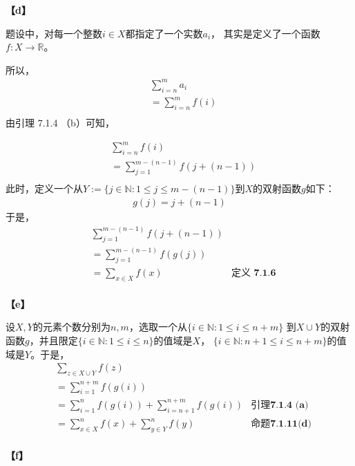 \documentclass{article}
\theoremstyle{mystyle}
\begin{document}
\textbf{【d】}

题设中，对每一个整数$i \in X$都指定了一个实数$a_i$，
其实是定义了一个函数$f:X \rightarrow \mathbb{R}$。

所以，
\begin{align*}
        & \sum\limits_{i=n}^m a_i   \\
        & =\sum\limits_{i=n}^m f(i) \\
\end{align*}
由引理 7.1.4 （b）可知，

\begin{align*}
        & \sum\limits_{i=n}^m f(i)                 \\
        & = \sum\limits_{j=1}^{m-(n-1)} f(j+(n-1)) \\
\end{align*}
此时，定义一个从$Y := \{j \in \mathbb{N}: 1 \leq j \leq m-(n-1)\}$到$X$的双射函数$g$如下：
\begin{align*}
       g(j) = j+(n-1)
\end{align*}
于是，
\begin{align*}
        & \sum\limits_{j=1}^{m-(n-1)} f(j+(n-1))                     \\
        & =\sum\limits_{j=1}^{m-(n-1)} f(g(j))                       \\
        & =\sum\limits_{x \in X} f(x)            & \textbf{定义 7.1.6} \\
\end{align*}

\textbf{【e】}

设$X,Y$的元素个数分别为$n,m$，选取一个从$\{i \in \mathbb{N}: 1 \leq i \leq n+m\}$
到$X \cup Y$的双射函数$g$，并且限定$\{i \in \mathbb{N}: 1 \leq i \leq n\}$的值域是$X$，
$\{i \in \mathbb{N}: n+1 \leq i \leq n+m\}$的值域是$Y$。于是，
\begin{align*}
        & \sum \limits_{z \in X \cup Y} f(z)                                                           \\
        & = \sum \limits_{i=1}^{n+m} f(g(i))                                                           \\
        & = \sum \limits_{i=1}^{n} f(g(i)) + \sum \limits_{i=n+1}^{n+m} f(g(i)) & \textbf{引理7.1.4 (a)} \\
        & = \sum \limits_{x \in X}^{n} f(x) + \sum \limits_{y \in Y}^{n} f(y)   & \textbf{命题7.1.11(d)} \\
\end{align*}

\textbf{【f】}
\end{document}
